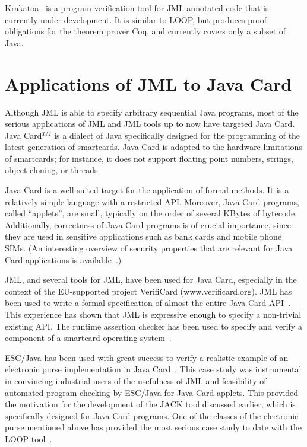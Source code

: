  Krakatoa~\cite{krakatoa03a} is a
 program verification tool for JML-annotated code that is currently
 under development.  It is similar to LOOP, but produces proof
 obligations for the theorem prover Coq, and
 currently covers only a subset of Java.

\section{Applications of JML to Java Card}
\label{applications}

Although JML is able to specify arbitrary sequential Java programs,
most of the serious applications of JML and JML tools up to now
have targeted Java Card.  Java Card$^{TM}$ is a dialect of Java specifically
designed for the programming of the latest generation of smartcards.
Java Card is adapted to the hardware limitations of smartcards; for
instance, it does not support floating point numbers, strings, object
cloning, or threads.

Java Card is a well-suited target for the application of formal
methods.  It is a relatively simple language with a restricted API\@.
Moreover, Java Card programs, called ``applets'', are small, typically
on the order of several KBytes of bytecode.  Additionally, correctness
of Java Card programs is of crucial importance, since they are used in
sensitive applications such as bank cards and mobile phone SIMs.  (An
interesting overview of security properties that are relevant for Java
Card applications is available~\cite{MarletLM01}.)

JML, and several tools for JML, have been used for Java Card,
especially in the context of the EU-supported project VerifiCard
(www.verificard.org).  JML has been used to write a formal
specification of almost the entire Java Card
API~\cite{PollBergJacobs01}.  This experience has shown that JML is
expressive enough to specify a non-trivial existing API\@.  The
runtime assertion checker has been used to specify and verify a
component of a smartcard operating system~\cite{PollHarteldeJong02}.

ESC/Java has been used with great success to verify a realistic
example of an electronic purse implementation in Java
Card~\cite{CatanoHuisman02}. This case study was instrumental in
convincing industrial users of the usefulness of JML and feasibility
of automated program checking by ESC/Java for Java Card applets.  This
provided the motivation for the development of the JACK tool discussed
earlier, which is specifically designed for Java Card programs.  One
of the classes of the electronic purse mentioned above has provided
the most serious case study to date with the LOOP
tool~\cite{BreunesseBJ02}.

